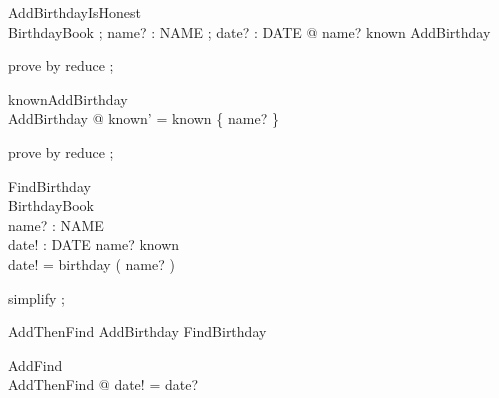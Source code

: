 \begin{theorem}{ AddBirthdayIsHonest}\\
 \forall BirthdayBook ; name? : NAME ; date? : DATE @ name? \notin known \implies \pre AddBirthday \\

\end{theorem}



\begin{zproof}[AddBirthdayIsHonest]

 prove by reduce ;
 

\end{zproof}



\begin{theorem}{ knownAddBirthday}\\
 \forall AddBirthday @ known' = known \cup \{ name? \} \\

\end{theorem}



\begin{zproof}[knownAddBirthday]

 prove by reduce ;
 

\end{zproof}



\begin{schema}{FindBirthday}
\\
 \Xi BirthdayBook \\
 name? : NAME \\
 date! : DATE 
\where
 name? \in known \\
 date! = birthday ( name? )
\end{schema}



\begin{zproof}

 simplify ;
 

\end{zproof}



\begin{zed}AddThenFind  AddBirthday \semi FindBirthday
\end{zed}



\begin{theorem}{ AddFind}\\
 \forall AddThenFind @ date! = date? \\

\end{theorem}



